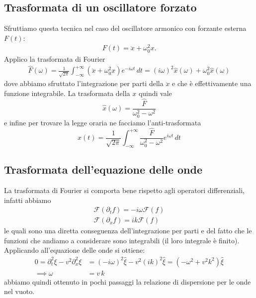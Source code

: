 \subsection{Trasformata di un oscillatore forzato}
Sfruttiamo questa tecnica nel caso del oscillatore armonico con forzante esterna $ F(t) $:
\begin{align}
  F(t) = \ddot{x} + \omega_0^2 x.
\end{align}
Applico la trasformata di Fourier
\begin{align}
  \hat{F}(\omega) = \frac{1}{\sqrt{2\pi}} \int_{-\infty}^{+\infty} \left( \ddot{x} + \omega_0^2 x \right) e^{-i\omega t} \,dt 
  = (i\omega)^2 \hat{x}(\omega) + \omega_0^2 \hat{x}(\omega)
\end{align}
dove abbiamo sfruttato l'integrazione per parti della $ \ddot{x} $ e che è effettivamente una funzione integrabile. La trasformata della $ x $ quindi vale
\begin{equation}
  \hat{x}(\omega) = \frac{\hat{F}}{\omega_0^2 - \omega^2}
\end{equation}
e infine per trovare la legge oraria ne facciamo l'anti-trasformata
\begin{equation}
  x(t) = \frac{1}{\sqrt{2\pi}} \int_{-\infty}^{+\infty} \frac{\hat{F}}{\omega_0^2 - \omega^2} e^{i\omega t} \,dt
\end{equation}

\subsection{Trasformata dell'equazione delle onde}
La trasformata di Fourier si comporta bene rispetto agli operatori differenziali, infatti abbiamo
\begin{align}
  \mathcal{F}(\partial_t f) = -i \omega \mathcal{F}(f)
  \\
  \mathcal{F}(\partial_x f) = i k \mathcal{F}(f)
\end{align}
le quali sono una diretta conseguenza dell'integrazione per parti e del fatto che le funzioni che andiamo a considerare sono integrabili 
(il loro integrale è finito). Applicando all'equazione delle onde si ottiene:
\begin{align}
  0 = \partial_t^2 \xi - v^2 \partial_x^2 \xi &= \left(- i \omega \right) ^2 \hat{\xi}- v^2 \left( i k  \right)^2 \hat{\xi} 
  = \left(-\omega^2 +v^2k^2 \right) \hat{\xi}
  \\
  \implies \omega &= v\,k \tag{relazione di dispersione}
\end{align}
abbiamo quindi ottenuto in pochi passaggi la relazione di dispersione per le onde nel vuoto. 
